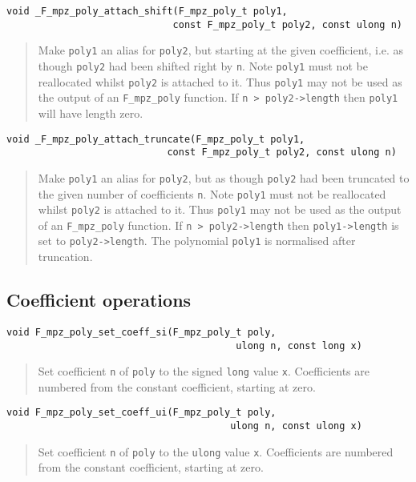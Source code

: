 \documentclass[a4paper,10pt]{article}
\newcommand{\code}{\lstinline}
\begin{document}
\begin{lstlisting}
void _F_mpz_poly_attach_shift(F_mpz_poly_t poly1, 
                             const F_mpz_poly_t poly2, const ulong n)
\end{lstlisting}
\begin{quote}
Make \code{poly1} an alias for \code{poly2}, but starting at the given coefficient, i.e. as though 
\code{poly2} had been shifted right by \code{n}. Note \code{poly1} must not be reallocated whilst 
\code{poly2} is attached to it. Thus \code{poly1} may not be used as the output of an \code{F_mpz_poly} 
function. If \code{n > poly2->length} then \code{poly1} will have length zero.
\end{quote}

\begin{lstlisting}
void _F_mpz_poly_attach_truncate(F_mpz_poly_t poly1, 
                            const F_mpz_poly_t poly2, const ulong n)
\end{lstlisting}
\begin{quote}
Make \code{poly1} an alias for \code{poly2}, but as though \code{poly2} had been truncated to the given 
number of coefficients \code{n}. Note \code{poly1} must not be reallocated whilst \code{poly2} is 
attached to it. Thus \code{poly1} may not be used as the output of an \code{F_mpz_poly} function. If 
\code{n > poly2->length} then \code{poly1->length} is set to \code{poly2->length}. The polynomial 
\code{poly1} is normalised after truncation.
\end{quote}

\subsection{Coefficient operations}

\begin{lstlisting}
void F_mpz_poly_set_coeff_si(F_mpz_poly_t poly, 
                                        ulong n, const long x)
\end{lstlisting}
\begin{quote}
Set coefficient \code{n} of \code{poly} to the signed \code{long} value \code{x}. Coefficients are 
numbered from the constant coefficient, starting at zero.
\end{quote}

\begin{lstlisting}
void F_mpz_poly_set_coeff_ui(F_mpz_poly_t poly, 
                                       ulong n, const ulong x)
\end{lstlisting}
\begin{quote}
Set coefficient \code{n} of \code{poly} to the \code{ulong} value \code{x}. Coefficients are 
numbered from the constant coefficient, starting at zero.
\end{quote}
\end{document}
